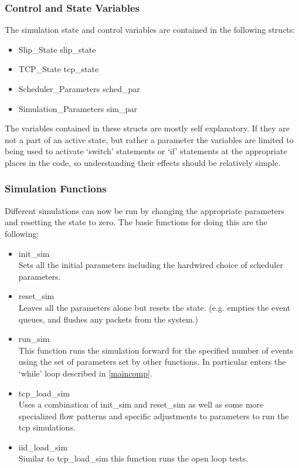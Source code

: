 \documentclass[11pt]{article}%
\begin{document}
\subsubsection{Control and State Variables}
The simulation state and control variables are contained in the following structs:
\begin{itemize}
\item Slip\_State slip\_state
\item TCP\_State tcp\_state
\item Scheduler\_Parameters sched\_par
\item Simulation\_Parameters sim\_par
\end{itemize}
The variables contained in these structs are mostly self explanatory.  If they are not a part of an active state, but rather a parameter the variables are limited to being used to activate `switch' statements or `if' statements at the appropriate places in the code, so understanding their effects should be relatively simple.

\subsubsection{Simulation Functions}
Different simulations can now be run by changing the appropriate parameters and resetting the state to zero.  The basic functions for doing this are the following:
\begin{itemize}
\item init\_sim\\
Sets all the initial parameters including the hardwired choice of scheduler parameters.
\item reset\_sim\\
Leaves all the parameters alone but resets the state.  (e.g. empties the event queues, and flushes any packets from the system.)
\item run\_sim\\
This function runs the simulation forward for the specified number of events using the set of parameters set by other functions.  In particular enters the `while' loop described in \ref{maincomp}.
\item tcp\_load\_sim\\
Uses a combination of init\_sim and reset\_sim as well as some more specialized flow patterns and specific adjustments to parameters to run the tcp simulations.
\item iid\_load\_sim\\
Similar to tcp\_load\_sim this function runs the open loop tests.
\end{itemize}
\end{document}
